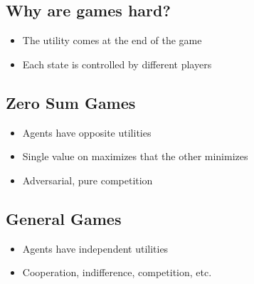 \documentclass[11pt]{article}
\begin{document}
\subsection{Why are games hard?}
\label{sec:org1b179bf}
\begin{itemize}
\item The utility comes at the end of the game
\item Each state is controlled by different players
\end{itemize}
\subsection{Zero Sum Games}
\label{sec:orgab77ab6}
\begin{itemize}
\item Agents have opposite utilities
\item Single value on maximizes that the other minimizes
\item Adversarial, pure competition
\end{itemize}
\subsection{General Games}
\label{sec:orgc869b9a}
\begin{itemize}
\item Agents have independent utilities
\item Cooperation, indifference, competition, etc.
\end{itemize}
\end{document}
